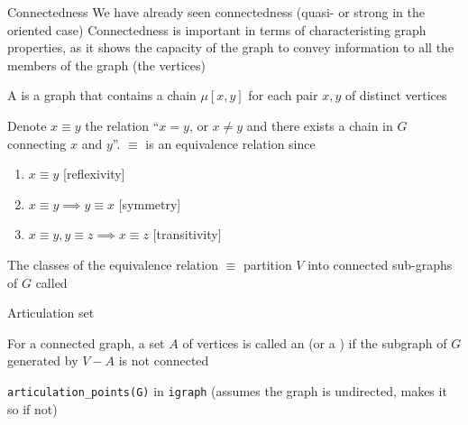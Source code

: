 \documentclass[aspectratio=169]{beamer}\usepackage[]{graphicx}\usepackage[]{xcolor}
\begin{document}


\begin{frame}{Connectedness}
We have already seen connectedness (quasi- or strong in the oriented case)
\vfill
Connectedness is important in terms of characteristing graph properties, as it shows the capacity of the graph to convey information to all the members of the graph (the vertices)
\end{frame}


\begin{frame}
	\begin{definition}
	A  is a graph that contains a chain $\mu[x,y]$ for each pair $x,y$ of distinct vertices
	\end{definition}
	\vfill
	Denote $x\equiv y$ the relation  ``$x=y$, or $x\neq y$ and there exists a chain in $G$ connecting $x$ and $y$''. $\equiv$ is an equivalence relation since
	\begin{enumerate}
		\item $x\equiv y$ \hfill[reflexivity]
		\item $x\equiv y\implies y\equiv x$ \hfill[symmetry]
		\item $x\equiv y, y\equiv z\implies x\equiv z$ \hfill[transitivity]
	\end{enumerate}
	\begin{definition}
	The classes of the equivalence relation $\equiv$ partition $V$ into connected sub-graphs of $G$ called 
	\end{definition}
	\end{frame}
	
\begin{frame}{Articulation set} 
	\begin{definition}
	For a connected graph, a set $A$ of vertices is called an  (or a ) if the subgraph of $G$ generated by $V-A$ is not connected
	\end{definition}
	\vfill
	{\tt articulation\_points(G)} in {\tt igraph} (assumes the graph is undirected, makes it so if not)
\end{frame}
\end{document}
